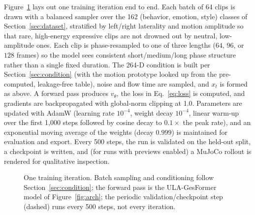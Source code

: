\documentclass[conference]{IEEEtran}
\begin{document}
Figure~\ref{fig:training} lays out one training iteration end to end.
Each batch of 64 clips is drawn with a balanced sampler over the 162
(behavior, emotion, style) classes of Section~\ref{sec:dataset},
stratified by left/right laterality and motion amplitude so that rare,
high-energy expressive clips are not drowned out by neutral,
low-amplitude ones. Each clip is phase-resampled to one of three
lengths ($64$, $96$, or $128$ frames) so the model sees consistent
short/medium/long phase structure rather than a single fixed duration.
The 264-D condition is built per Section~\ref{sec:condition} (with the
motion prototype looked up from the pre-computed, leakage-free table),
noise and flow time are sampled, and $x_t$ is formed as above. A
forward pass produces $v_\theta$, the loss in Eq.~\ref{eq:loss} is
computed, and gradients are backpropagated with global-norm clipping
at 1.0. Parameters are updated with AdamW (learning rate $10^{-4}$,
weight decay $10^{-4}$, linear warm-up over the first 1{,}000 steps
followed by cosine decay to $0.1\times$ the peak rate), and an
exponential moving average of the weights (decay $0.999$) is
maintained for evaluation and export. Every 500 steps, the run is
validated on the held-out split, a checkpoint is written, and (for
runs with previews enabled) a MuJoCo rollout is rendered for
qualitative inspection.

\begin{figure}[t]
\centering
{}
\caption{One training iteration. Batch sampling and conditioning
follow Section~\ref{sec:condition}; the forward pass is the
ULA-GesFormer model of Figure~\ref{fig:arch}; the periodic
validation/checkpoint step (dashed) runs every 500 steps, not every
iteration.}
\label{fig:training}
\end{figure}
\end{document}
